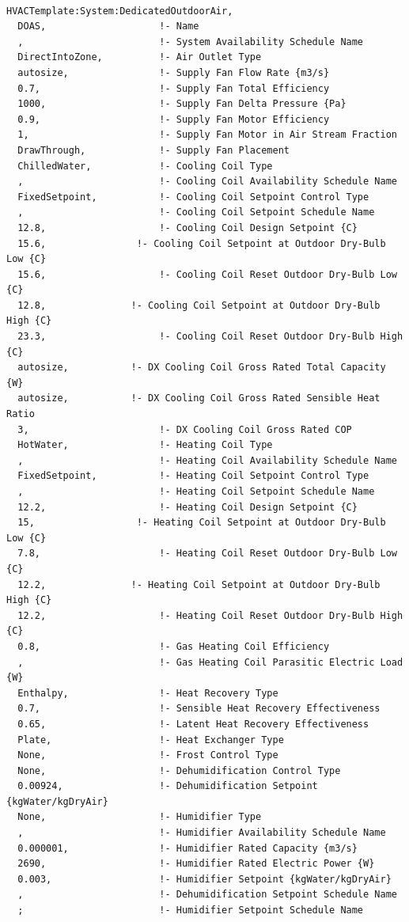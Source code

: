 \begin{lstlisting}

HVACTemplate:System:DedicatedOutdoorAir,
  DOAS,                    !- Name
  ,                        !- System Availability Schedule Name
  DirectIntoZone,          !- Air Outlet Type
  autosize,                !- Supply Fan Flow Rate {m3/s}
  0.7,                     !- Supply Fan Total Efficiency
  1000,                    !- Supply Fan Delta Pressure {Pa}
  0.9,                     !- Supply Fan Motor Efficiency
  1,                       !- Supply Fan Motor in Air Stream Fraction
  DrawThrough,             !- Supply Fan Placement
  ChilledWater,            !- Cooling Coil Type
  ,                        !- Cooling Coil Availability Schedule Name
  FixedSetpoint,           !- Cooling Coil Setpoint Control Type
  ,                        !- Cooling Coil Setpoint Schedule Name
  12.8,                    !- Cooling Coil Design Setpoint {C}
  15.6,                !- Cooling Coil Setpoint at Outdoor Dry-Bulb Low {C}
  15.6,                    !- Cooling Coil Reset Outdoor Dry-Bulb Low {C}
  12.8,               !- Cooling Coil Setpoint at Outdoor Dry-Bulb High {C}
  23.3,                    !- Cooling Coil Reset Outdoor Dry-Bulb High {C}
  autosize,           !- DX Cooling Coil Gross Rated Total Capacity {W}
  autosize,           !- DX Cooling Coil Gross Rated Sensible Heat Ratio
  3,                       !- DX Cooling Coil Gross Rated COP
  HotWater,                !- Heating Coil Type
  ,                        !- Heating Coil Availability Schedule Name
  FixedSetpoint,           !- Heating Coil Setpoint Control Type
  ,                        !- Heating Coil Setpoint Schedule Name
  12.2,                    !- Heating Coil Design Setpoint {C}
  15,                  !- Heating Coil Setpoint at Outdoor Dry-Bulb Low {C}
  7.8,                     !- Heating Coil Reset Outdoor Dry-Bulb Low {C}
  12.2,               !- Heating Coil Setpoint at Outdoor Dry-Bulb High {C}
  12.2,                    !- Heating Coil Reset Outdoor Dry-Bulb High {C}
  0.8,                     !- Gas Heating Coil Efficiency
  ,                        !- Gas Heating Coil Parasitic Electric Load {W}
  Enthalpy,                !- Heat Recovery Type
  0.7,                     !- Sensible Heat Recovery Effectiveness
  0.65,                    !- Latent Heat Recovery Effectiveness
  Plate,                   !- Heat Exchanger Type
  None,                    !- Frost Control Type
  None,                    !- Dehumidification Control Type
  0.00924,                 !- Dehumidification Setpoint {kgWater/kgDryAir}
  None,                    !- Humidifier Type
  ,                        !- Humidifier Availability Schedule Name
  0.000001,                !- Humidifier Rated Capacity {m3/s}
  2690,                    !- Humidifier Rated Electric Power {W}
  0.003,                   !- Humidifier Setpoint {kgWater/kgDryAir}
  ,                        !- Dehumidification Setpoint Schedule Name
  ;                        !- Humidifier Setpoint Schedule Name
\end{lstlisting}

